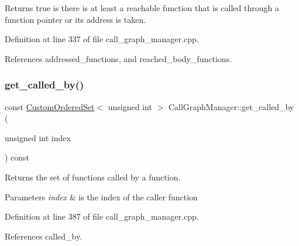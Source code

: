 Returns true is there is at least a reachable function that is called through a function pointer or its address is taken. 



Definition at line 337 of file call\+\_\+graph\+\_\+manager.\+cpp.



References addressed\+\_\+functions, and reached\+\_\+body\+\_\+functions.

\mbox{\label{classCallGraphManager_a1ca66c62247b79f10f792b58b5bd93a0}} 
\subsubsection{\texorpdfstring{get\+\_\+called\+\_\+by()}{get\_called\_by()}\hspace{0.1cm}{\footnotesize\ttfamily [1/2]}}
{\footnotesize\ttfamily const \hyperlink{classCustomOrderedSet}{Custom\+Ordered\+Set}$<$ unsigned int $>$ Call\+Graph\+Manager\+::get\+\_\+called\+\_\+by (\begin{DoxyParamCaption}\item[{unsigned int}]{index }\end{DoxyParamCaption}) const}



Returns the set of functions called by a function. 


\begin{DoxyParams}{Parameters}
{\em index} & is the index of the caller function \\
\hline
\end{DoxyParams}


Definition at line 387 of file call\+\_\+graph\+\_\+manager.\+cpp.



References called\+\_\+by.

\mbox{\label{classCallGraphManager_af47e8c559960a5351867e97c30b33c66}} 
